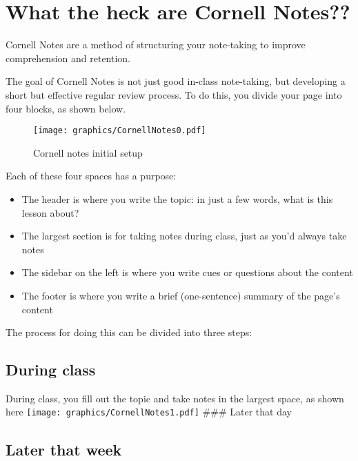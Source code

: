 \documentclass[
  letterpaper,
  DIV=11,
  numbers=noendperiod]{scrartcl}
\providecommand{\tightlist}{%
  \setlength{\itemsep}{0pt}\setlength{\parskip}{0pt}}\usepackage{longtable,booktabs,array}
\begin{document}
\hypertarget{cornellnotes}{%
\section{What the heck are Cornell Notes??}\label{cornellnotes}}

Cornell Notes are a method of structuring your note-taking to improve
comprehension and retention.

The goal of Cornell Notes is not just good in-class note-taking, but
developing a short but effective regular review process. To do this, you
divide your page into four blocks, as shown below.

\begin{figure}

{\centering \texttt{[image: graphics/CornellNotes0.pdf]}

}

\caption{Cornell notes initial setup}

\end{figure}

Each of these four spaces has a purpose:

\begin{itemize}
\tightlist
\item
  The header is where you write the topic: in just a few words, what is
  this lesson about?
\item
  The largest section is for taking notes during class, just as you'd
  always take notes
\item
  The sidebar on the left is where you write cues or questions about the
  content
\item
  The footer is where you write a brief (one-sentence) summary of the
  page's content
\end{itemize}

The process for doing this can be divided into three steps:

\subsection{During class}

During class, you fill out the topic and take notes in the largest
space, as shown here \texttt{[image: graphics/CornellNotes1.pdf]} \#\#\#
Later that day

\subsection{Later that week}
\end{document}
